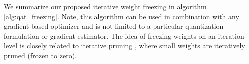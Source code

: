 
We summarize our proposed iterative weight freezing in algorithm \ref{alg:qat_freezing}. Note, this algorithm can be used in combination with any gradient-based optimizer and is not limited to a particular quantization formulation or gradient estimator. The idea of freezing weights on an iteration level is closely related to iterative pruning \citep{zhu2017prune}, where small weights are iteratively pruned (frozen to zero).

% 